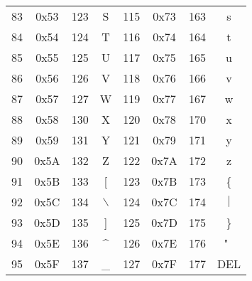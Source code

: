 \begin{longtable}{|c|c|c|c||c|c|c|c|}
83 & 0x53 & 123 & S & 115 & 0x73 & 163 & s \\
84 & 0x54 & 124 & T & 116 & 0x74 & 164 & t \\
85 & 0x55 & 125 & U & 117 & 0x75 & 165 & u \\
86 & 0x56 & 126 & V & 118 & 0x76 & 166 & v \\
87 & 0x57 & 127 & W & 119 & 0x77 & 167 & w \\
88 & 0x58 & 130 & X & 120 & 0x78 & 170 & x \\
89 & 0x59 & 131 & Y & 121 & 0x79 & 171 & y \\
90 & 0x5A & 132 & Z & 122 & 0x7A & 172 & z \\
91 & 0x5B & 133 & [ & 123 & 0x7B & 173 & \{ \\
92 & 0x5C & 134 & $\backslash$ & 124 & 0x7C & 174 & $\mid$\\
93 & 0x5D & 135 & ] & 125 & 0x7D & 175 & \} \\
94 & 0x5E & 136 & \^{} & 126 & 0x7E & 176 & "~ \\
95 & 0x5F & 137 & \_ & 127 & 0x7F & 177 & DEL \\
\hline
\end{longtable}

